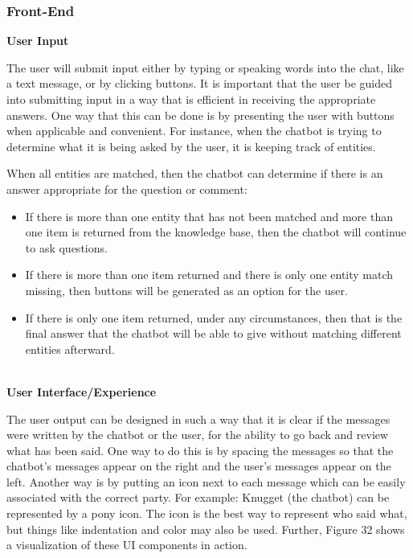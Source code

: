 \documentclass[titlepage, 12pt]{article}
\begin{document}
\subsubsection{Front-End}

\textbf{User Input}

The user will submit input either by typing or speaking words into the chat, like a text message, or by clicking buttons. It is important that the user be guided into submitting input in a way that is efficient in receiving the appropriate answers. One way that this can be done is by presenting the user with buttons when applicable and convenient. For instance, when the chatbot is trying to determine what it is being asked by the user, it is keeping track of entities.

When all entities are matched, then the chatbot can determine if there is an answer appropriate for the question or comment:

\begin{itemize}
    \item If there is more than one entity that has not been matched and more than one item is returned from the knowledge base, then the chatbot will continue to ask questions.
    \item If there is more than one item returned and there is only one entity match missing, then buttons will be generated as an option for the user.
    \item If there is only one item returned, under any circumstances, then that is the final answer that the chatbot will be able to give without matching different entities afterward. \\ \\
\end{itemize}

\textbf{User Interface/Experience}

The user output can be designed in such a way that it is clear if the messages were written by the chatbot or the user, for the ability to go back and review what has been said. One way to do this is by spacing the messages so that the chatbot’s messages appear on the right and the user’s messages appear on the left. Another way is by putting an icon next to each message which can be easily associated with the correct party. For example: Knugget (the chatbot) can be represented by a pony icon. The icon is the best way to represent who said what, but things like indentation and color may also be used. Further, Figure 32 shows a visualization of these UI components in action.
\end{document}
